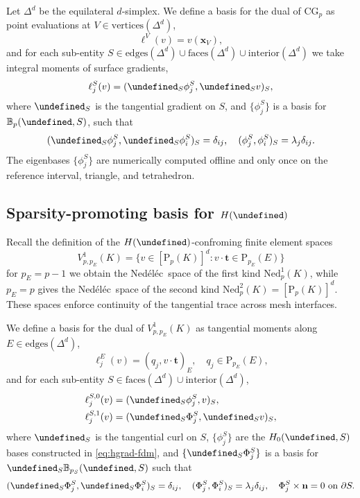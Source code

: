 \documentclass[review,onefignum,onetabnum,a4paper]{siamart190516}
\let\grad\undefined
\let\curl\undefined
\DeclareMathOperator{\grad}{grad}
\DeclareMathOperator{\curl}{curl}
\newcommand{\Hcurl}{H(\curl)}
\renewcommand{\vec}[1]{\mathbf{#1}}
\newcommand{\bn}{\vec{n}}
\newcommand{\bt}{\vec{t}}
\newcommand{\bx}{\vec{x}}
\renewcommand{\P}{\mathrm{P}}
\newcommand{\CG}{\mathrm{CG}}
\newcommand{\Ned}{\mathrm{Ned}^{1}}
\newcommand{\NedTwo}{\mathrm{Ned}^{2}}
\newcommand{\Nedelec}{Ned\'el\'ec~}
\begin{document}
Let $\Delta^d$ be the equilateral $d$-simplex.
We define a basis for the dual of $\CG_p$ as 
point evaluations at $V \in \text{vertices}(\Delta^d)$,
\begin{equation}
   \ell^V(v) = v(\bx_V),
\end{equation}
and for each sub-entity $S \in \text{edges}(\Delta^d) \cup \text{faces}(\Delta^d) \cup \text{interior}(\Delta^d)$
we take integral moments of surface gradients, 
\begin{equation}
   \ell^S_j(v) = (\grad_S\phi^S_j, \grad_S v)_{S},
\end{equation}
where $\grad_S$ is the tangential gradient on $S$,
and $\{\phi^S_j\}$ is a basis for $\mathbb{B}_{p}(\grad, S)$, such that
\begin{equation} \label{eq:hgrad-fdm}
   (\grad_S\phi^S_j, \grad_S\phi^S_i)_{S} = \delta_{ij}, \quad
   (\phi^S_j, \phi^S_i)_{S} = \lambda_j\delta_{ij}.
\end{equation}
The eigenbases $\{\phi^S_j\}$ are numerically computed offline and only once 
on the reference interval, triangle, and tetrahedron.


\subsection{Sparsity-promoting basis for $\Hcurl$}

Recall the definition of the $\Hcurl$-confroming finite element spaces
\begin{equation}
V^1_{p, p_E}(K) = \{v\in [\P_p(K)]^d : v\cdot\bt \in \P_{p_E}(E) \}
\end{equation}
for $p_E=p-1$ we obtain the \Nedelec space of the first kind $\Ned_p(K)$, while
$p_E=p$ gives the \Nedelec space of the second kind $\NedTwo_p(K) = [\P_p(K)]^d$. 
These spaces enforce continuity of the tangential trace across mesh interfaces.


We define a basis for the dual of $V^1_{p, p_E}(K)$ as 
tangential moments along $E\in \text{edges}(\Delta^d)$,
\begin{equation}
   \ell^E_j(v) = (q_j, v\cdot \bt)_E, \quad q_j \in \P_{p_E}(E), 
\end{equation}
and for each sub-entity $S \in \text{faces}(\Delta^d) \cup \text{interior}(\Delta^d)$,
\begin{align}
   \ell^{S,0}_j(v) &= (\grad_S\phi^S_j, v)_{S}, \\
   \ell^{S,1}_j(v) &= (\curl_S\Phi^S_j, \curl_S v)_{S},
\end{align}
where $\curl_S$ is the tangential curl on $S$,
$\{\phi^S_j\}$ are the $H_0(\grad, S)$ bases constructed in \eqref{eq:hgrad-fdm},
and $\{\curl_S\Phi^S_j\}$ is a basis for $\curl_S \mathbb{B}_{p_S}(\curl, S)$
such that
\begin{equation} \label{eq:hcurl-fdm}
   (\curl_S\Phi^S_j, \curl_S\Phi^S_i)_{S} = \delta_{ij}, \quad
   (\Phi^S_j, \Phi^S_i)_{S} = \lambda_j\delta_{ij}, \quad
   \Phi^S_j\times\bn = 0 \text{ on }\partial S.
\end{equation}
\end{document}
